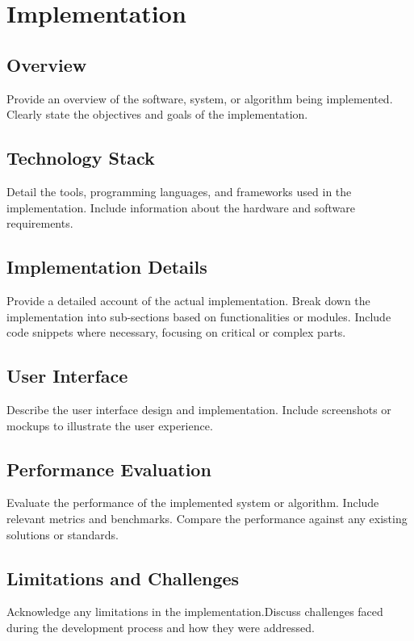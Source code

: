\chapter{Implementation}
\label{chap:Implementation}

\section{Overview}
Provide an overview of the software, system, or algorithm being implemented.
Clearly state the objectives and goals of the implementation.

\section{Technology Stack}
Detail the tools, programming languages, and frameworks used in the implementation. Include information about the hardware and software requirements.

\section{Implementation Details}
Provide a detailed account of the actual implementation. Break down the implementation into sub-sections based on functionalities or modules. Include code snippets where necessary, focusing on critical or complex parts.

\section{User Interface}
Describe the user interface design and implementation. Include screenshots or mockups to illustrate the user experience.

\section{Performance Evaluation}
Evaluate the performance of the implemented system or algorithm. Include relevant metrics and benchmarks. Compare the performance against any existing solutions or standards.

\section{Limitations and Challenges}
Acknowledge any limitations in the implementation.Discuss challenges faced during the development process and how they were addressed.
